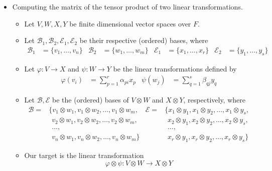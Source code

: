 \documentclass[../notes.tex]{subfiles}
\begin{document}
\begin{itemize}
\begin{itemize}
    \end{itemize}
    \item Computing the matrix of the tensor product of two linear transformations.
    \begin{itemize}
        \item Let $V,W,X,Y$ be finite dimensional vector spaces over $F$.
        \item Let $\mathcal{B}_1,\mathcal{B}_2,\mathcal{E}_1,\mathcal{E}_2$ be their respective (ordered) bases, where
        \begin{align*}
            \mathcal{B}_1 &= \{v_1,\dots,v_n\}&
            \mathcal{B}_2 &= \{w_1,\dots,w_m\}&
            \mathcal{E}_1 &= \{x_1,\dots,x_r\}&
            \mathcal{E}_2 &= \{y_1,\dots,y_s\}&
        \end{align*}
        \item Let $\varphi:V\to X$ and $\psi:W\to Y$ be the linear transformations defined by
        \begin{align*}
            \varphi(v_i) &= \sum_{p=1}^r\alpha_{pi}x_p&
            \psi(w_j) &= \sum_{q=1}^s\beta_{qj}y_q
        \end{align*}
        \item Let $\mathcal{B},\mathcal{E}$ be the (ordered) bases of $V\otimes W$ and $X\otimes Y$, respectively, where
        \begin{align*}
            \mathcal{B} ={}& \{v_1\otimes w_1,v_1\otimes w_2,\dots,v_1\otimes w_m,&
                \mathcal{E} ={}& \{x_1\otimes y_1,x_1\otimes y_2,\dots,x_1\otimes y_s,\\
            &\hspace{5pt} v_2\otimes w_1,v_2\otimes w_2,\dots,v_2\otimes w_m,&
                &\hspace{5pt} x_2\otimes y_1,x_2\otimes y_2,\dots,x_2\otimes y_s,\\
            &\hspace{5pt} \dots,&
                &\hspace{5pt} \dots,\\
            &\hspace{5pt} v_n\otimes w_1,v_n\otimes w_2,\dots,v_n\otimes w_m\}&
                &\hspace{5pt} x_r\otimes y_1,x_r\otimes y_2,\dots,x_r\otimes y_s\}
        \end{align*}
        \item Our target is the linear transformation
        \begin{equation*}
            \varphi\otimes\psi:V\otimes W\to X\otimes Y

\end{equation*}
\end{itemize}
\end{itemize}
\end{document}
